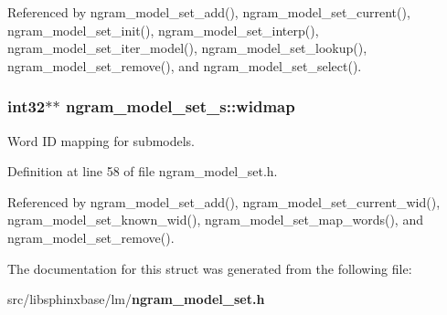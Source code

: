 Referenced by ngram\+\_\+model\+\_\+set\+\_\+add(), ngram\+\_\+model\+\_\+set\+\_\+current(), ngram\+\_\+model\+\_\+set\+\_\+init(), ngram\+\_\+model\+\_\+set\+\_\+interp(), ngram\+\_\+model\+\_\+set\+\_\+iter\+\_\+model(), ngram\+\_\+model\+\_\+set\+\_\+lookup(), ngram\+\_\+model\+\_\+set\+\_\+remove(), and ngram\+\_\+model\+\_\+set\+\_\+select().

\subsubsection[{widmap}]{\setlength{\rightskip}{0pt plus 5cm}int32$\ast$$\ast$ ngram\+\_\+model\+\_\+set\+\_\+s\+::widmap}\label{structngram__model__set__s_addebde44e2b7aa22dd82032c316fc962}


Word I\+D mapping for submodels. 



Definition at line 58 of file ngram\+\_\+model\+\_\+set.\+h.



Referenced by ngram\+\_\+model\+\_\+set\+\_\+add(), ngram\+\_\+model\+\_\+set\+\_\+current\+\_\+wid(), ngram\+\_\+model\+\_\+set\+\_\+known\+\_\+wid(), ngram\+\_\+model\+\_\+set\+\_\+map\+\_\+words(), and ngram\+\_\+model\+\_\+set\+\_\+remove().



The documentation for this struct was generated from the following file\+:\begin{DoxyCompactItemize}
\item 
src/libsphinxbase/lm/{\bf ngram\+\_\+model\+\_\+set.\+h}\end{DoxyCompactItemize}
